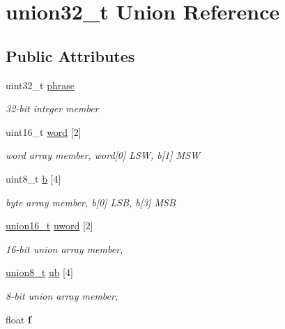 \hypertarget{unionunion32__t}{\section{union32\+\_\+t Union Reference}
\label{unionunion32__t}
}
\subsection*{Public Attributes}
\begin{DoxyCompactItemize}
\item 
\hypertarget{unionunion32__t_a6256a82d45639c6c23910575809e56d6}{uint32\+\_\+t \hyperlink{unionunion32__t_a6256a82d45639c6c23910575809e56d6}{phrase}}\label{unionunion32__t_a6256a82d45639c6c23910575809e56d6}

\begin{DoxyCompactList}\small\item\em 32-\/bit integer member \end{DoxyCompactList}\item 
\hypertarget{unionunion32__t_a6465d1f8eb3958bec8769451823b5366}{uint16\+\_\+t \hyperlink{unionunion32__t_a6465d1f8eb3958bec8769451823b5366}{word} \mbox{[}2\mbox{]}}\label{unionunion32__t_a6465d1f8eb3958bec8769451823b5366}

\begin{DoxyCompactList}\small\item\em word array member, word\mbox{[}0\mbox{]} L\+S\+W, b\mbox{[}1\mbox{]} M\+S\+W \end{DoxyCompactList}\item 
\hypertarget{unionunion32__t_a3ac2fc9fc00f4f8b983a26daf1dd52dd}{uint8\+\_\+t \hyperlink{unionunion32__t_a3ac2fc9fc00f4f8b983a26daf1dd52dd}{b} \mbox{[}4\mbox{]}}\label{unionunion32__t_a3ac2fc9fc00f4f8b983a26daf1dd52dd}

\begin{DoxyCompactList}\small\item\em byte array member, b\mbox{[}0\mbox{]} L\+S\+B, b\mbox{[}3\mbox{]} M\+S\+B \end{DoxyCompactList}\item 
\hyperlink{unionunion16__t}{union16\+\_\+t} \hyperlink{unionunion32__t_a5a8da2aeb9d883c30f36685eb609d4cc}{uword} \mbox{[}2\mbox{]}
\begin{DoxyCompactList}\small\item\em 16-\/bit union array member, \end{DoxyCompactList}\item 
\hyperlink{unionunion8__t}{union8\+\_\+t} \hyperlink{unionunion32__t_af2870a5e20f8f9c9a7f13fa56b1d3346}{ub} \mbox{[}4\mbox{]}
\begin{DoxyCompactList}\small\item\em 8-\/bit union array member, \end{DoxyCompactList}\item 
\hypertarget{unionunion32__t_abea22cfb546257ea612adcd19d25ac8e}{float {\bfseries f}}\label{unionunion32__t_abea22cfb546257ea612adcd19d25ac8e}


\end{DoxyCompactItemize}
